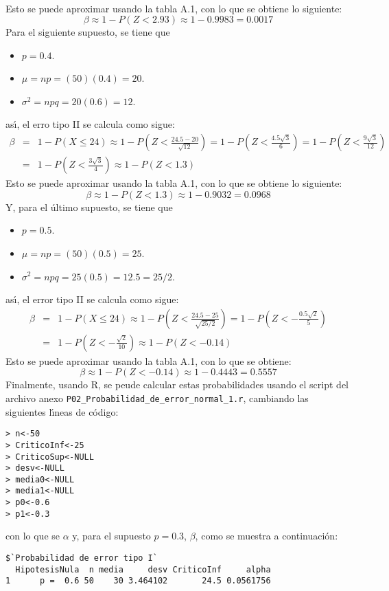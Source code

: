 \begin{solucion}
\begin{eqnarray*}
 \end{eqnarray*}
 Esto se puede aproximar usando la tabla A.1, con lo que se obtiene lo siguiente:
 \begin{equation*}
  \beta \approx 1 - P(Z < 2.93) \approx  1 - 0.9983 = 0.0017
 \end{equation*}
 Para el siguiente supuesto, se tiene que
 \begin{itemize}
  \item $p = 0.4$.
  \item $\mu = np = (50)(0.4) = 20$.
  \item $\sigma^2 = npq = 20(0.6) = 12$.
 \end{itemize}
 as\'{\i}, el erro tipo II se calcula como sigue:
 \begin{eqnarray*}
  \beta & = & 1 - P(X \leq 24) \approx 1 - P\left( Z < \frac{24.5 - 20}{\sqrt{12}} \right) = 1 - P\left( Z < \frac{4.5\sqrt{3}}{6} \right) = 1 - P\left( Z < \frac{9\sqrt{3}}{12} \right) \\
  & = & 1 - P\left( Z < \frac{3\sqrt{3}}{4} \right) \approx 1 - P(Z < 1.3)
 \end{eqnarray*}
 Esto se puede aproximar usando la tabla A.1, con lo que se obtiene lo siguiente:
 \begin{equation*}
  \beta \approx 1 - P(Z < 1.3) \approx 1 - 0.9032 = 0.0968
 \end{equation*}
 Y, para el \'ultimo supuesto, se tiene que
 \begin{itemize}
  \item $p = 0.5$.
  \item $\mu = np = (50)(0.5) = 25$.
  \item $\sigma^2 = npq = 25(0.5) = 12.5 = 25/2$.
 \end{itemize}
 as\'{\i}, el error tipo II se calcula como sigue:
 \begin{eqnarray*}
  \beta & = & 1 - P(X \leq 24) \approx 1 - P\left( Z < \frac{24.5 - 25}{\sqrt{25/2}} \right) = 1 - P\left( Z < -\frac{0.5\sqrt{2}}{5} \right) \\
  & = & 1 - P\left( Z < -\frac{\sqrt{2}}{10} \right) \approx 1 - P\left( Z < -0.14 \right)
 \end{eqnarray*}
 Esto se puede aproximar usando la tabla A.1, con lo que se obtiene:
 \begin{equation*}
  \beta \approx 1 - P\left( Z < -0.14 \right) \approx 1 - 0.4443 = 0.5557
 \end{equation*}
 Finalmente, usando R, se peude calcular estas probabilidades usando el script del archivo anexo \texttt{P02\_Probabilidad\_de\_error\_normal\_1.r}, cambiando las siguientes l\'{\i}neas de c\'odigo:
 \begin{verbatim}
> n<-50
> CriticoInf<-25
> CriticoSup<-NULL
> desv<-NULL
> media0<-NULL
> media1<-NULL
> p0<-0.6
> p1<-0.3
 \end{verbatim}
 \vspace{-0.5cm}
 con lo que se $\alpha$ y, para el supuesto $p = 0.3$, $\beta$, como se muestra a continuaci\'on:
 \begin{verbatim}
$`Probabilidad de error tipo I`
  HipotesisNula  n media     desv CriticoInf     alpha
1      p =  0.6 50    30 3.464102       24.5 0.0561756


\end{verbatim}
\end{solucion}
